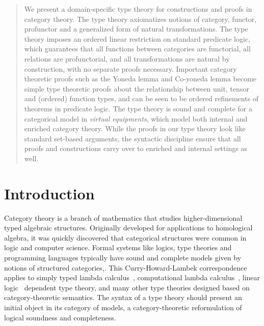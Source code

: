 \documentclass{llncs}
\begin{document}
\begin{abstract}
  We present a domain-specific type theory for constructions and proofs
  in category theory. The type theory axiomatizes notions of category,
  functor, profunctor and a generalized form of natural
  transformations. The type theory imposes an ordered linear restriction
  on standard predicate logic, which guarantees that all functions
  between categories are functorial, all relations are profunctorial,
  and all transformations are natural by construction, with no separate
  proofs necessary. Important category theoretic proofs such as the
  Yoneda lemma and Co-yoneda lemma become simple type theoretic proofs
  about the relationship between unit, tensor and (ordered) function
  types, and can be seen to be ordered refinements of theorems in
  predicate logic.  The type theory is sound and complete for a
  categorical model in \emph{virtual equipments}, which model both
  internal and enriched category theory. While the proofs in our type
  theory look like standard set-based arguments, the syntactic
  discipline ensure that all proofs and constructions carry over to
  enriched and internal settings as well.
\end{abstract}

\section{Introduction}

Category theory is a branch of mathematics that studies
higher-dimensional typed algebraic structures.
%
Originally developed for applications to homological algebra, it was
quickly discovered that categorical structures were common in logic and
computer science.  Formal systems like logics, type theories and
programming languages typically have sound and complete models given by
notions of structured categories,\cite{lawvere,goguen,lambek,moggi}.
%
This Curry-Howard-Lambek correspondence~\cite{curry-howard-lambek}
applies to simply typed lambda calculus~\cite{lambekscott},
computational lambda calculus~\cite{moggi}, linear logic~\cite{girard}
dependent type theory\cite{cartmell1986}, and many other type theories
designed based on category-theoretic semantics.
%
The syntax of a type theory should present an initial object in its
category of models, a category-theoretic reformulation of logical
soundness and completeness.
\end{document}
